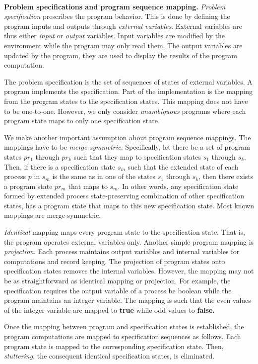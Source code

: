 \documentclass[11pt]{llncs}
\begin{document}
\ \\ \textbf{Problem specifications and program sequence mapping.}
\emph{Problem specification} prescribes the program behavior. This is
done by defining the program inputs and outputs through \emph{external
  variables}. External variables are thus either \emph{input} or
\emph{output} variables. Input variables are modified by the
environment while the program may only read them. The output variables
are updated by the program, they are used to display the results of
the program computation.

The problem specification is the set of sequences of states of
external variables.  A program implements the specification.  Part of
the implementation is the mapping from the program states to the
specification states. This mapping does not have to be
one-to-one. However, we only consider \emph{unambiguous} programs
where each program state maps to only one specification state. 

We make another important assumption about program sequence mappings.
The mappings have to be \emph{merge-symmetric}. Specifically, let
there be a set of program states $pr_1$ through $pr_k$ such that they
map to specification states $s_1$ through $s_k$. Then, if there is a
specification state $s_m$ such that the extended state of each process
$p$ in $s_m$ is the same as in one of the states $s_1$ through $s_k$,
then there exists a program state $pr_m$ that maps to $s_m$. In other
words, any specification state formed by extended process
state-preserving combination of other specification states, has a
program state that maps to this new specification state.  Most known
mappings are merge-symmetric.


\emph{Identical} mapping maps every program state to the specification
state.  That is, the program operates external variables only.
Another simple program mapping is \emph{projection}. Each process
maintains output variables and internal variables for computations and
record keeping. The projection of program states onto specification
states removes the internal variables.  However, the mapping may not
be as straightforward as identical mapping or projection. For example,
the specification requires the output variable of a process be boolean
while the program maintains an integer variable. The mapping is such
that the even values of the integer variable are mapped to
\textbf{true} while odd values to \textbf{false}.

Once the mapping between program and specification states is
established, the program computations are mapped to specification
sequences as follows. Each program state is mapped to the
corresponding specification state. Then, \emph{stuttering}, the
consequent identical specification states, is eliminated.
\end{document}
